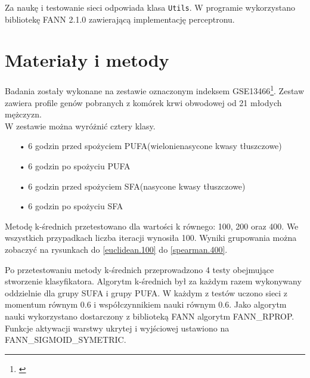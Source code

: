 \documentclass{classrep}
\begin{document}
Za naukę i testowanie sieci odpowiada klasa \verb+Utils+. W programie wykorzystano bibliotekę FANN 2.1.0 zawierającą implementację perceptronu.

\section{Materiały i metody}
Badania zostały wykonane na zestawie oznaczonym indeksem GSE13466\footnote{\cite{research}}. Zestaw zawiera profile genów pobranych z komórek krwi obwodowej od 21 młodych mężczyzn. \\W zestawie można wyróżnić cztery klasy.
\begin{itemize}
\item[•] 6 godzin przed spożyciem PUFA(wielonienasycone kwasy tłuszczowe)
\item[•] 6 godzin po spożyciu PUFA
\item[•] 6 godzin przed spożyciem SFA(nasycone kwasy tłuszczowe)
\item[•] 6 godzin po spożyciu SFA\\
\end{itemize}

Metodę k-średnich przetestowano dla wartości k równego: 100, 200 oraz 400. We wszystkich przypadkach liczba iteracji wynosiła 100. Wyniki grupowania można zobaczyć na rysunkach do \ref{euclidean.100} do \ref{spearman.400}.

Po przetestowaniu metody k-średnich przeprowadzono 4 testy obejmujące stworzenie klasyfikatora. Algorytm k-średnich był za każdym razem wykonywany oddzielnie dla grupy SUFA i grupy PUFA. W każdym z testów uczono sieci z momentum równym 0.6 i współczynnikiem nauki równym 0.6. Jako algorytm nauki wykorzystano dostarczony z biblioteką FANN algorytm FANN\_RPROP. Funkcje aktywacji warstwy ukrytej i wyjściowej ustawiono na FANN\_SIGMOID\_SYMETRIC.
\end{document}
